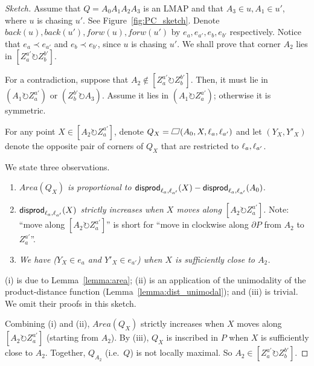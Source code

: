 \documentclass{ws-ijcga}
\begin{document}
\begin{proof}[Sketch]
Assume that $Q=A_0A_1A_2A_3$ is an LMAP and that $A_3\in u,A_1\in u'$, where $u$ is chasing $u'$. See Figure~\ref{fig:PC_sketch}.
Denote $back(u),back(u'),forw(u),forw(u')$ by $e_a,e_{a'},e_b,e_{b'}$ respectively.
Notice that $e_{a}\prec e_{a'}$ and $e_b\prec e_{b'}$, since $u$ is chasing $u'$.
We shall prove that corner $A_2$ lies in $[Z_a^{a'}\circlearrowright Z_b^{b'}]$.

For a contradiction, suppose that $A_2\notin [Z_a^{a'}\circlearrowright Z_b^{b'}]$.
Then, it must lie in $(A_1\circlearrowright Z_a^{a'})$ or $(Z_b^{b'}\circlearrowright A_3)$.
Assume it lies in $(A_1\circlearrowright Z_a^{a'})$; otherwise it is symmetric.


For any point $X\in[A_2\circlearrowright Z_a^{a'}]$, denote $Q_X=\parallelogram(A_0,X,\el_a,\el_{a'})$ and
  let $(Y_X,Y'_X)$ denote the opposite pair of corners of $Q_X$ that are restricted to $\ell_a,\ell_{a'}$.

We state three observations.
\begin{enumerate}
\item[(i)] \emph{$Area(Q_X)$ is proportional to $\mathsf{disprod}_{\ell_a,\ell_{a'}}(X)-\mathsf{disprod}_{\ell_a,\ell_{a'}}(A_0)$.}
\item[(ii)] \emph{$\mathsf{disprod}_{\ell_a,\ell_{a'}}(X)$ strictly increases when $X$ moves along $[A_2\circlearrowright Z_a^{a'}]$.} Note:
``move along $[A_2\circlearrowright Z_a^{a'}]$'' is short for ``move in clockwise along $\partial P$ from $A_2$ to $Z_a^{a'}$''.
\item[(iii)] \emph{We have ($Y_X\in e_a$ and $Y'_X\in e_{a'}$) when $X$ is sufficiently close to $A_2$.}
\end{enumerate}

(i) is due to Lemma~\ref{lemma:area}; (ii) is an application of the unimodality of the product-distance function (Lemma~\ref{lemma:dist_unimodal});
  and (iii) is trivial. We omit their proofs in this sketch.

\smallskip Combining (i) and (ii), $Area(Q_X)$ strictly increases when $X$ moves along $[A_2\circlearrowright Z_a^{a'}]$ (starting from $A_2$).
By (iii), $Q_X$ is inscribed in $P$ when $X$ is sufficiently close to $A_2$. Together, $Q_{A_2}$ (i.e.\ $Q$) is not locally maximal.
So $A_2\in [Z_a^{a'}\circlearrowright Z_b^{b'}]$.
\end{proof}
\end{document}
